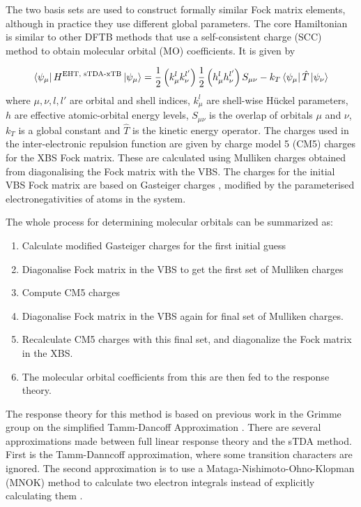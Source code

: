 The two basis sets are used to construct formally similar Fock matrix elements,
although in practice they use different global parameters. The core Hamiltonian
is similar to other DFTB methods that use a self-consistent charge (SCC) method 
to obtain molecular orbital (MO) coefficients. It is given by

\begin{equation}
\bra{\psi_\mu} H^{\text{EHT, sTDA-xTB}} \ket{\psi_\mu}= \frac{1}{2} \left(k^l_\mu k^{l'}_\nu\right) \frac{1}{2} \left(h^l_\mu h^{l'}_\nu\right) S_{\mu\nu} - k_T \bra{\psi_\mu}\hat{T}\ket{\psi_\nu}
\end{equation}
%
where $\mu,\nu,l,l'$ are orbital and shell indices, $k^l_\mu$ are shell-wise 
H{\"u}ckel parameters, $h$ are effective atomic-orbital energy levels, $S_{\mu\nu}$
is the overlap of orbitals $\mu$ and $\nu$, $k_T$ is a global constant and $\hat{T}$
is the kinetic energy operator. The charges used in the inter-electronic repulsion 
function are given by charge model 5 (CM5) \cite{Marenich2012} charges for the XBS
Fock matrix. These are calculated using Mulliken charges obtained from diagonalising
the Fock matrix with the VBS. The charges for the initial VBS Fock matrix are based
on Gasteiger charges \cite{Gasteiger1978}, modified by the parameterised
electronegativities of atoms in the system.

The whole process for determining molecular orbitals can be summarized as:
\begin{enumerate}
	\item Calculate modified Gasteiger charges for the first initial guess
	\item Diagonalise Fock matrix in the VBS to get the first set of Mulliken charges
	\item Compute CM5 charges
	\item Diagonalise Fock matrix in the VBS again for final set of Mulliken charges.
	\item Recalculate CM5 charges with this final set, and diagonalize the Fock matrix in the XBS. 
	\item The molecular orbital coefficients from this are then fed to the response theory.
\end{enumerate}

The response theory for this method is based on previous work in the Grimme group
on the simplified Tamm-Dancoff Approximation \cite{Grimme2013}. There are several
approximations made between full linear response theory and the sTDA method. First
is the Tamm-Danncoff approximation, where some transition characters are ignored. 
The second approximation is to use a Mataga-Nishimoto-Ohno-Klopman (MNOK) method 
to calculate two electron integrals instead of explicitly calculating them \cite{Nishimoto1957, Ohno1964, Klopman1964}.

